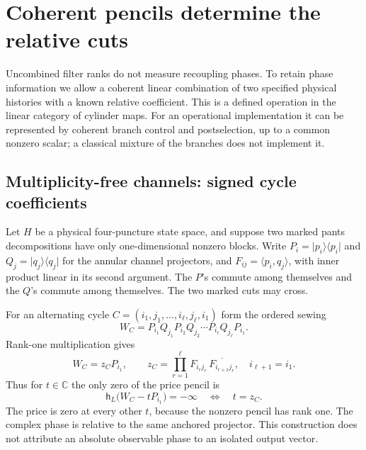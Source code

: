 \documentclass[11pt]{article}
\numberwithin{equation}{section}
\theoremstyle{definition}
\theoremstyle{remark}
\newcommand{\FF}{\mathbb C}
\begin{document}
\section{Coherent pencils determine the relative cuts}\label{sec:recoupling}

Uncombined filter ranks do not measure recoupling phases. To retain phase information we allow a coherent linear combination of two specified physical histories with a known relative coefficient. This is a defined operation in the linear category of cylinder maps. For an operational implementation it can be represented by coherent branch control and postselection, up to a common nonzero scalar; a classical mixture of the branches does not implement it.

\subsection{Multiplicity-free channels: signed cycle coefficients}

Let \(H\) be a physical four-puncture state space, and suppose two marked pants decompositions have only one-dimensional nonzero blocks. Write \(P_i=\lvert p_i\rangle\langle p_i\rvert\) and \(Q_j=\lvert q_j\rangle\langle q_j\rvert\) for the annular channel projectors, and \(F_{ij}=\langle p_i,q_j\rangle\), with inner product linear in its second argument. The \(P\)'s commute among themselves and the \(Q\)'s commute among themselves. The two marked cuts may cross.

For an alternating cycle \(C=(i_1,j_1,\ldots,i_\ell,j_\ell,i_1)\) form the ordered sewing
\begin{equation}\label{eq:cycle}
 W_C=P_{i_1}Q_{j_1}P_{i_2}Q_{j_2}\cdots P_{i_\ell}Q_{j_\ell}P_{i_1}.
\end{equation}
Rank-one multiplication gives
\begin{equation}\label{eq:coeff}
       W_C=z_C P_{i_1},\qquad
       z_C=\prod_{r=1}^{\ell}F_{i_rj_r}\,
                    \overline{F_{i_{r+1}j_r}},
       \quad i_{\ell+1}=i_1.
\end{equation}
Thus for \(t\in\FF\) the only zero of the price pencil is
\begin{equation}\label{eq:linearpencil}
   \mathsf h_L\big(W_C-tP_{i_1}\big)=-\infty
          \quad\Longleftrightarrow\quad t=z_C .
\end{equation}
The price is zero at every other \(t\), because the nonzero pencil has rank one. The complex phase is relative to the same anchored projector. This construction does not attribute an absolute observable phase to an isolated output vector.
\end{document}
